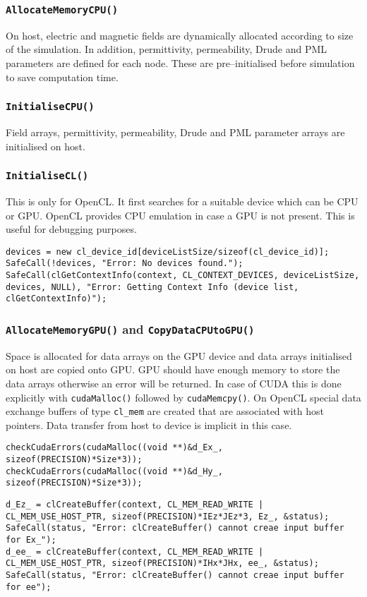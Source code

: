 \subsubsection{\texttt{AllocateMemoryCPU()}}
On host, electric and magnetic fields are dynamically allocated according to size of the simulation. In addition, permittivity, permeability, Drude and PML parameters are defined for each node. These are pre--initialised before simulation to save computation time.
\subsubsection{\texttt{InitialiseCPU()}}
Field arrays, permittivity, permeability, Drude and PML parameter arrays are initialised on host.
\subsubsection{\texttt{InitialiseCL()}}
This is only for OpenCL. It first searches for a suitable device which can be CPU or GPU. OpenCL provides CPU emulation in case a GPU is not present. This is useful for debugging purposes.
\label{lst:OpenCL-Device-Search}
\begin{lstlisting}[caption={Device selection in OpenCL}]
devices = new cl_device_id[deviceListSize/sizeof(cl_device_id)];
SafeCall(!devices, "Error: No devices found.");
SafeCall(clGetContextInfo(context, CL_CONTEXT_DEVICES, deviceListSize, devices, NULL), "Error: Getting Context Info (device list, clGetContextInfo)");
\end{lstlisting}
\subsubsection{\texttt{AllocateMemoryGPU()} and \texttt{CopyDataCPUtoGPU()}}
Space is allocated for data arrays on the GPU device and data arrays initialised on host are copied onto GPU. GPU should have enough memory to store the data arrays otherwise an error will be returned. In case of CUDA this is done explicitly with \texttt{cudaMalloc()} followed by \texttt{cudaMemcpy()}. On OpenCL special data exchange buffers of type \verb|cl_mem| are created that are associated with host pointers. Data transfer from host to device is implicit in this case.
\label{lst:CUDA-Host-Memory-Allocation}
\begin{lstlisting}[caption={Device memory allocation in CUDA}]
checkCudaErrors(cudaMalloc((void **)&d_Ex_, sizeof(PRECISION)*Size*3));
checkCudaErrors(cudaMalloc((void **)&d_Hy_, sizeof(PRECISION)*Size*3));
\end{lstlisting}
\label{lst:OpenCL-Device-Memory-Buffers}
\begin{lstlisting}[caption={Device memory allocation in OpenCL}]
d_Ez_ = clCreateBuffer(context, CL_MEM_READ_WRITE | CL_MEM_USE_HOST_PTR, sizeof(PRECISION)*IEz*JEz*3, Ez_, &status);
SafeCall(status, "Error: clCreateBuffer() cannot creae input buffer for Ex_");
d_ee_ = clCreateBuffer(context, CL_MEM_READ_WRITE | CL_MEM_USE_HOST_PTR, sizeof(PRECISION)*IHx*JHx, ee_, &status);
SafeCall(status, "Error: clCreateBuffer() cannot creae input buffer for ee");
\end{lstlisting}
